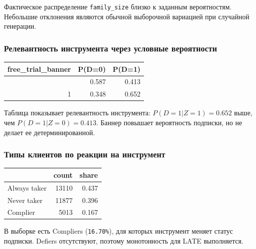 \documentclass[11pt]{article}
\newcounter{none}
\begin{document}
Фактическое распределение \texttt{family\_size} близко к заданным
вероятностям. Небольшие отклонения являются обычной выборочной вариацией
при случайной генерации.

\subsubsection{Релевантность инструмента через условные
вероятности}\label{ux440ux435ux43bux435ux432ux430ux43dux442ux43dux43eux441ux442ux44c-ux438ux43dux441ux442ux440ux443ux43cux435ux43dux442ux430-ux447ux435ux440ux435ux437-ux443ux441ux43bux43eux432ux43dux44bux435-ux432ux435ux440ux43eux44fux442ux43dux43eux441ux442ux438}

{\def\LTcaptype{none} %
\begin{longtable}[]{@{}rrr@{}}
\toprule\noalign{}
free\_trial\_banner & P(D=0) & P(D=1) \\
\midrule\noalign{}
\endhead
\bottomrule\noalign{}
\endlastfoot
0 & 0.587 & 0.413 \\
1 & 0.348 & 0.652 \\
\end{longtable}
}

Таблица показывает релевантность инструмента: \(P(D=1|Z=1)=0.652\) выше,
чем \(P(D=1|Z=0)=0.413\). Баннер повышает вероятность подписки, но не
делает ее детерминированной.

\subsubsection{Типы клиентов по реакции на
инструмент}\label{ux442ux438ux43fux44b-ux43aux43bux438ux435ux43dux442ux43eux432-ux43fux43e-ux440ux435ux430ux43aux446ux438ux438-ux43dux430-ux438ux43dux441ux442ux440ux443ux43cux435ux43dux442}

{\def\LTcaptype{none} %
\begin{longtable}[]{@{}lrr@{}}
\toprule\noalign{}
& count & share \\
\midrule\noalign{}
\endhead
\bottomrule\noalign{}
\endlastfoot
Always taker & 13110 & 0.437 \\
Never taker & 11877 & 0.396 \\
Complier & 5013 & 0.167 \\
\end{longtable}
}

В выборке есть Compliers (\texttt{16.70\%}), для которых инструмент
меняет статус подписки. Defiers отсутствуют, поэтому монотонность для
LATE выполняется.
\end{document}
